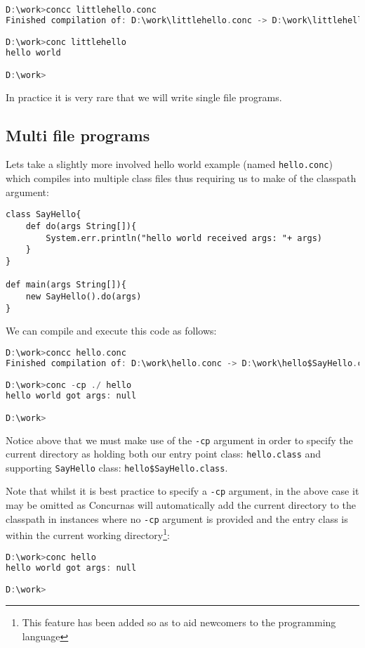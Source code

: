 \documentclass[conc-doc]{subfiles}
\begin{document}
\begin{lstlisting}[language=C]
D:\work>concc littlehello.conc
Finished compilation of: D:\work\littlehello.conc -> D:\work\littlehello.class [littlehello]

D:\work>conc littlehello
hello world

D:\work>
\end{lstlisting}

In practice it is very rare that we will write single file programs.

\subsection{Multi file programs}
Lets take a slightly more involved hello world example (named \lstinline{hello.conc}) which compiles into multiple class files thus requiring us to make of the classpath argument:

\begin{lstlisting}
class SayHello{
	def do(args String[]){
		System.err.println("hello world received args: "+ args)
	}
}

def main(args String[]){
	new SayHello().do(args)
}
\end{lstlisting}

We can compile and execute this code as follows:

\begin{lstlisting}[language=C]
D:\work>concc hello.conc
Finished compilation of: D:\work\hello.conc -> D:\work\hello$SayHello.class [hello$SayHello], D:\work\hello.class [hello]

D:\work>conc -cp ./ hello
hello world got args: null

D:\work>
\end{lstlisting}

Notice above that we must make use of the \lstinline{-cp} argument in order to specify the current directory as holding both our entry point class: \lstinline{hello.class} and supporting \lstinline{SayHello} class: \lstinline{hello$SayHello.class}.

Note that whilst it is best practice to specify a \lstinline{-cp} argument, in the above case it may be omitted as Concurnas will automatically add the current directory to the classpath in instances where no \lstinline{-cp} argument is provided and the entry class is within the current working directory\footnote{This feature has been added so as to aid newcomers to the programming language}:

\begin{lstlisting}[language=C]
D:\work>conc hello
hello world got args: null

D:\work>
\end{lstlisting}
\end{document}
